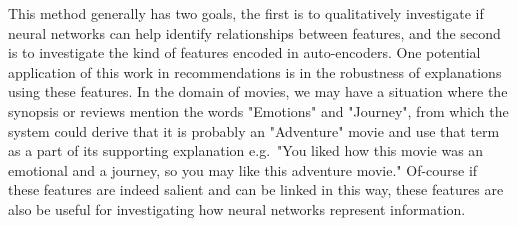 This method generally has two goals, the first is to qualitatively investigate if neural networks can help identify relationships between features, and the second is  to investigate the kind of features encoded in auto-encoders. One potential application of this work in recommendations is in the robustness of explanations using these features. In the domain of movies, we may have a situation where the synopsis or reviews mention the words "Emotions" and "Journey", from which the system could derive that it is probably an "Adventure" movie and use that term as a part of its supporting explanation e.g.\ "You liked how this movie was an emotional and a journey, so you may like this adventure movie." Of-course if these features are indeed salient and can be linked in this way, these features are also be useful for investigating how  neural networks represent information.



